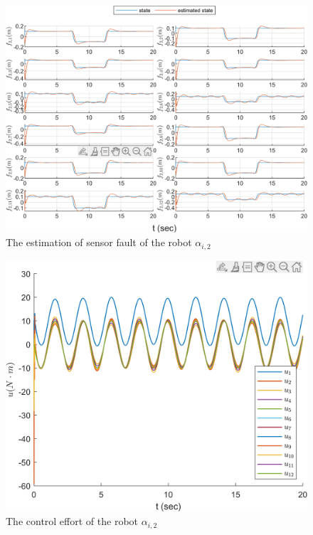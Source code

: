 \documentclass{ieeeaccess}
\begin{document}
\begin{figure}[htbp]
    \centering
    \includegraphics[scale=.57]{fig/robot (3).png}\caption{The estimation of sensor fault of the robot $\alpha_{i,2}$}%
    \label{fig:robot, fs}
\end{figure}
\begin{figure}[htbp]
    \centering
    \includegraphics[scale=.57]{fig/robot (4).png}\caption{The control effort of the robot $\alpha_{i,2}$}%
    \label{fig:robot, control}
\end{figure}
\end{document}
